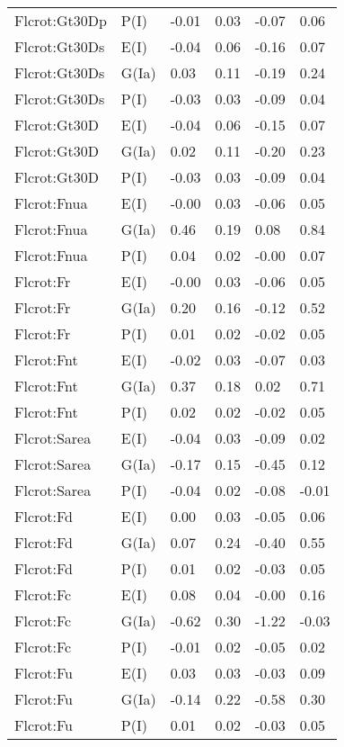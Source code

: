 \begin{center}
\begin{longtable}{|p{1.1in}|p{0.7in}|p{0.7in}|p{0.6in}|p{0.6in}|p{0.6in}|}
  Flcrot:Gt30Dp & P(I) & -0.01 & 0.03 & -0.07 & 0.06 \\ 
  Flcrot:Gt30Ds & E(I) & -0.04 & 0.06 & -0.16 & 0.07 \\ 
  Flcrot:Gt30Ds & G(Ia) & 0.03 & 0.11 & -0.19 & 0.24 \\ 
  Flcrot:Gt30Ds & P(I) & -0.03 & 0.03 & -0.09 & 0.04 \\ 
  Flcrot:Gt30D & E(I) & -0.04 & 0.06 & -0.15 & 0.07 \\ 
  Flcrot:Gt30D & G(Ia) & 0.02 & 0.11 & -0.20 & 0.23 \\ 
  Flcrot:Gt30D & P(I) & -0.03 & 0.03 & -0.09 & 0.04 \\ 
  Flcrot:Fnua & E(I) & -0.00 & 0.03 & -0.06 & 0.05 \\ 
  Flcrot:Fnua & G(Ia) & 0.46 & 0.19 & 0.08 & 0.84 \\ 
  Flcrot:Fnua & P(I) & 0.04 & 0.02 & -0.00 & 0.07 \\ 
  Flcrot:Fr & E(I) & -0.00 & 0.03 & -0.06 & 0.05 \\ 
  Flcrot:Fr & G(Ia) & 0.20 & 0.16 & -0.12 & 0.52 \\ 
  Flcrot:Fr & P(I) & 0.01 & 0.02 & -0.02 & 0.05 \\ 
  Flcrot:Fnt & E(I) & -0.02 & 0.03 & -0.07 & 0.03 \\ 
  Flcrot:Fnt & G(Ia) & 0.37 & 0.18 & 0.02 & 0.71 \\ 
  Flcrot:Fnt & P(I) & 0.02 & 0.02 & -0.02 & 0.05 \\ 
  Flcrot:Sarea & E(I) & -0.04 & 0.03 & -0.09 & 0.02 \\ 
  Flcrot:Sarea & G(Ia) & -0.17 & 0.15 & -0.45 & 0.12 \\ 
  Flcrot:Sarea & P(I) & -0.04 & 0.02 & -0.08 & -0.01 \\ 
  Flcrot:Fd & E(I) & 0.00 & 0.03 & -0.05 & 0.06 \\ 
  Flcrot:Fd & G(Ia) & 0.07 & 0.24 & -0.40 & 0.55 \\ 
  Flcrot:Fd & P(I) & 0.01 & 0.02 & -0.03 & 0.05 \\ 
  Flcrot:Fc & E(I) & 0.08 & 0.04 & -0.00 & 0.16 \\ 
  Flcrot:Fc & G(Ia) & -0.62 & 0.30 & -1.22 & -0.03 \\ 
  Flcrot:Fc & P(I) & -0.01 & 0.02 & -0.05 & 0.02 \\ 
  Flcrot:Fu & E(I) & 0.03 & 0.03 & -0.03 & 0.09 \\ 
  Flcrot:Fu & G(Ia) & -0.14 & 0.22 & -0.58 & 0.30 \\ 
  Flcrot:Fu & P(I) & 0.01 & 0.02 & -0.03 & 0.05 \\ 

\end{longtable}
\end{center}
